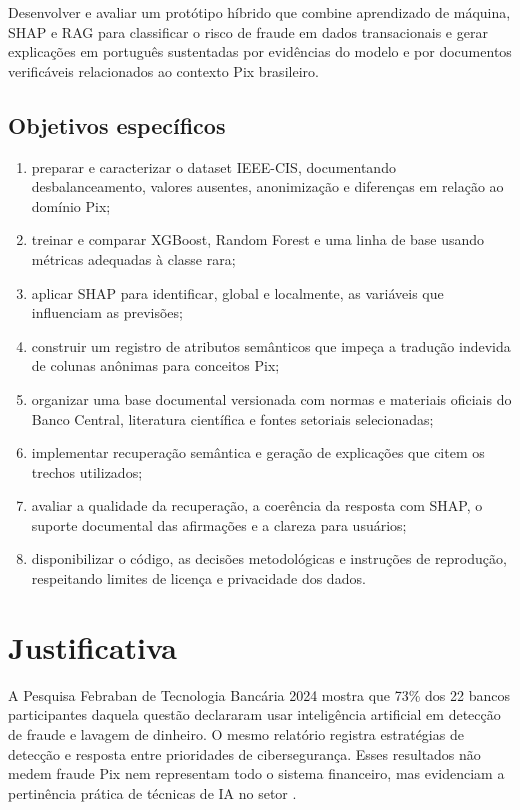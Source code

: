 Desenvolver e avaliar um protótipo híbrido que combine aprendizado de máquina, SHAP e RAG para classificar o risco de fraude em dados transacionais e gerar explicações em português sustentadas por evidências do modelo e por documentos verificáveis relacionados ao contexto Pix brasileiro.

\subsection{Objetivos específicos}

\begin{enumerate}
  \item preparar e caracterizar o dataset IEEE-CIS, documentando desbalanceamento, valores ausentes, anonimização e diferenças em relação ao domínio Pix;
  \item treinar e comparar XGBoost, Random Forest e uma linha de base usando métricas adequadas à classe rara;
  \item aplicar SHAP para identificar, global e localmente, as variáveis que influenciam as previsões;
  \item construir um registro de atributos semânticos que impeça a tradução indevida de colunas anônimas para conceitos Pix;
  \item organizar uma base documental versionada com normas e materiais oficiais do Banco Central, literatura científica e fontes setoriais selecionadas;
  \item implementar recuperação semântica e geração de explicações que citem os trechos utilizados;
  \item avaliar a qualidade da recuperação, a coerência da resposta com SHAP, o suporte documental das afirmações e a clareza para usuários;
  \item disponibilizar o código, as decisões metodológicas e instruções de reprodução, respeitando limites de licença e privacidade dos dados.
\end{enumerate}

\section{Justificativa}

A Pesquisa Febraban de Tecnologia Bancária 2024 mostra que 73\% dos 22 bancos participantes daquela questão declararam usar inteligência artificial em detecção de fraude e lavagem de dinheiro. O mesmo relatório registra estratégias de detecção e resposta entre prioridades de cibersegurança. Esses resultados não medem fraude Pix nem representam todo o sistema financeiro, mas evidenciam a pertinência prática de técnicas de IA no setor \cite{febraban2024}.

